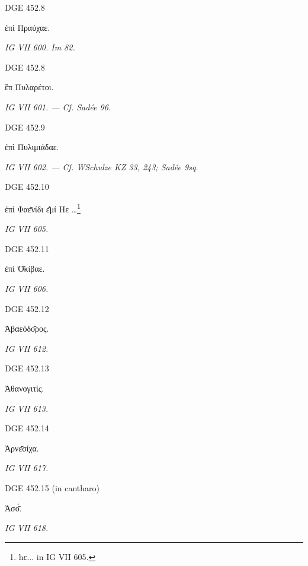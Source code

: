 \begin{versi}{DGE 452.8}
\begin{greek}
ἐπὶ Πραύ{\verso[1]}χαε.
\end{greek}
\end{versi}
\textit{IG VII 600. Im 82.}

\begin{versi}{DGE 452.8}
\begin{greek}
ἒπ Πυλαρέτοι.
\end{greek}
\end{versi}
\textit{IG VII 601. — Cf. Sadée 96.}

\begin{versi}{DGE 452.9}
\begin{greek}
ἐπὶ Πυλιμιάδαε.
\end{greek}
\end{versi}
\textit{IG VII 602. — Cf. WSchulze KZ 33, 243; Sadée 9sq.}

\begin{versi}{DGE 452.10}
\begin{greek}
ἐπὶ Φαε̄νίδι ε̄̓μί Hε …\footnote{h\textgreek{ε...} in IG VII 605.}
\end{greek}
\end{versi}
\textit{IG VII 605.}

\begin{versi}{DGE 452.11}
\begin{greek}
ἐπὶ Ὀ̄κίβαε.
\end{greek}
\end{versi}
\textit{IG VII 606.}

\begin{versi}{DGE 452.12}
\begin{greek}
Ἀβαεόδο̄ρος.
\end{greek}
\end{versi}
\textit{IG VII 612.}

\begin{versi}{DGE 452.13}
\begin{greek}
Ἀθανογιτίς.
\end{greek}
\end{versi}
\textit{IG VII 613.}

\begin{versi}{DGE 452.14}
\begin{greek}
Ἀρνε̄σίχα.
\end{greek}
\end{versi}
\textit{IG VII 617.}

\begin{versi}{DGE 452.15}
(in cantharo)
\begin{greek}
Ἀσο̄́.
\end{greek}
\end{versi}
\textit{IG VII 618.}

